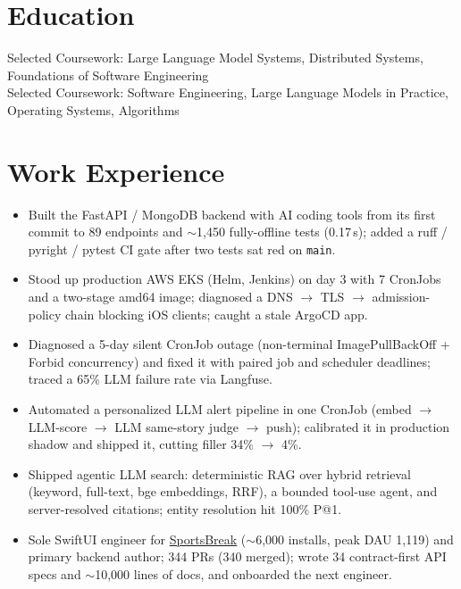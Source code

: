 \documentclass[11pt, letterpaper]{article}
\begin{document}

\section{Education}
Selected Coursework: Large Language Model Systems, Distributed Systems, Foundations of Software Engineering\\[1pt]
Selected Coursework: Software Engineering, Large Language Models in Practice, Operating Systems, Algorithms

\section{Work Experience}
\begin{itemize}
  \item Built the FastAPI / MongoDB backend with AI coding tools from its first commit to 89 endpoints and $\sim$1{,}450 fully-offline tests (0.17\,s); added a ruff / pyright / pytest CI gate after two tests sat red on \texttt{main}.
  \item Stood up production AWS EKS (Helm, Jenkins) on day 3 with 7 CronJobs and a two-stage amd64 image; diagnosed a DNS $\to$ TLS $\to$ admission-policy chain blocking iOS clients; caught a stale ArgoCD app.
  \item Diagnosed a 5-day silent CronJob outage (non-terminal ImagePullBackOff + Forbid concurrency) and fixed it with paired job and scheduler deadlines; traced a 65\% LLM failure rate via Langfuse.
  \item Automated a personalized LLM alert pipeline in one CronJob (embed $\to$ LLM-score $\to$ LLM same-story judge $\to$ push); calibrated it in production shadow and shipped it, cutting filler 34\% $\to$ 4\%.
  \item Shipped agentic LLM search: deterministic RAG over hybrid retrieval (keyword, full-text, bge embeddings, RRF), a bounded tool-use agent, and server-resolved citations; entity resolution hit 100\% P@1.
  \item Sole SwiftUI engineer for \href{https://apps.apple.com/app/id6762649287}{SportsBreak} ($\sim$6{,}000 installs, peak DAU 1{,}119) and primary backend author; 344 PRs (340 merged); wrote 34 contract-first API specs and $\sim$10{,}000 lines of docs, and onboarded the next engineer.
\end{itemize}
\end{document}
